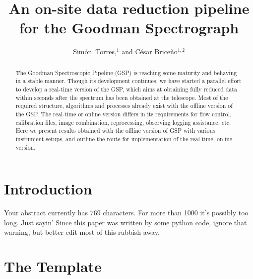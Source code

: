 \documentclass[11pt,twoside]{article}
\begin{document}
\title{An on-site data reduction pipeline for the Goodman Spectrograph}


\author{Sim\'on~Torres,$^1$ and C\'esar Brice\~no$^{1,2}$
  }           %



  
\begin{abstract}

The Goodman Spectroscopic Pipeline (GSP) is reaching some maturity and
behaving in a stable manner. Though its development continues, we have
started a parallel effort to develop a real-time version of the GSP,
which aims at obtaining fully reduced data within seconds after the spectrum
has been obtained at the telescope.  Most of the required structure, algorithms and
processes already exist with the offline version of the GSP. The real-time or online
version differs in its requirements for flow control, calibration files, image combination, reprocessing, observing logging assistance, etc.
Here we present results obtained with the offline version of GSP with various instrument setups, and outline the route for implementation of the real time, online version.
  
\end{abstract}

\section{Introduction}

Your abstract currently has 769 characters. For more than 1000 it's possibly too long. Just sayin'
Since this paper was written by some python code, ignore that warning, but better edit most of this rubbish away.


\section{The Template}
\end{document}
